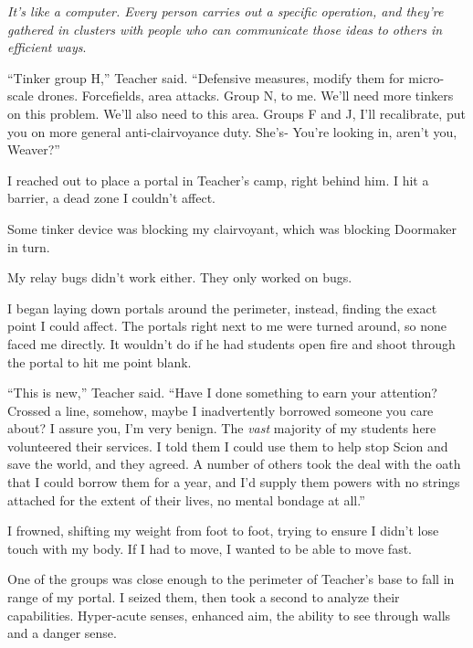 \emph{It's like a computer.  Every person carries out a specific operation, and they're gathered in clusters with people who can communicate those ideas to others in efficient ways}.



``Tinker group H,'' Teacher said.  ``Defensive measures, modify them for micro-scale drones.  Forcefields, area attacks.  Group N, to me.  We'll need more tinkers on this problem.  We'll also need to this area.  Groups F and J, I'll recalibrate, put you on more general anti-clairvoyance duty.  She's- You're looking in, aren't you, Weaver?''



I reached out to place a portal in Teacher's camp, right behind him.  I hit a barrier, a dead zone I couldn't affect.



Some tinker device was blocking my clairvoyant, which was blocking Doormaker in turn.



My relay bugs didn't work either.  They only worked on bugs.



I began laying down portals around the perimeter, instead, finding the exact point I could affect.  The portals right next to me were turned around, so none faced me directly.  It wouldn't do if he had students open fire and shoot through the portal to hit me point blank.



``This is new,'' Teacher said.  ``Have I done something to earn your attention?  Crossed a line, somehow, maybe I inadvertently borrowed someone you care about?  I assure you, I'm very benign.  The \emph{vast} majority of my students here volunteered their services.  I told them I could use them to help stop Scion and save the world, and they agreed.  A number of others took the deal with the oath that I could borrow them for a year, and I'd supply them powers with no strings attached for the extent of their lives, no mental bondage at all.''



I frowned, shifting my weight from foot to foot, trying to ensure I didn't lose touch with my body.  If I had to move, I wanted to be able to move fast.



One of the groups was close enough to the perimeter of Teacher's base to fall in range of my portal.  I seized them, then took a second to analyze their capabilities.  Hyper-acute senses, enhanced aim, the ability to see through walls and a danger sense.



